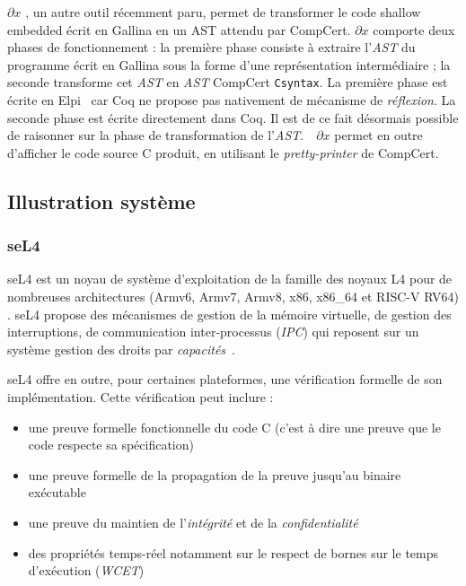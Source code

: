 $\partial x$ \cite{partialx, partialxrepo}, un autre outil récemment paru, permet de transformer le code shallow embedded écrit en Gallina en un AST attendu par CompCert. $\partial x$ comporte deux phases de fonctionnement : la première phase consiste à extraire l'\emph{AST} du programme écrit en Gallina sous la forme d'une représentation intermédiaire ; la seconde transforme cet \emph{AST} en \emph{AST} CompCert \texttt{Csyntax}. La première phase est écrite en Elpi~\cite{elpi} car Coq ne propose pas nativement de mécanisme de \emph{réflexion}. La seconde phase est écrite directement dans Coq. Il est de ce fait désormais possible de raisonner sur la phase de transformation de l'\emph{AST}.~~$\partial x$ permet en outre d'afficher le code source C produit, en utilisant le \emph{pretty-printer} de CompCert.

		\subsection{Illustration système}	

			\subsubsection{seL4}
	seL4 \cite{sel4website} est un noyau de système d'exploitation de la famille des noyaux L4 pour de nombreuses architectures (Armv6, Armv7, Armv8, x86, x86\_64 et RISC-V RV64) \cite{sel4hardware}. seL4 propose des mécanismes de gestion de la mémoire virtuelle, de gestion des interruptions, de communication inter-processus (\emph{IPC}) qui reposent sur un système gestion des droits par \emph{capacités}~\cite{capabilities}.

	seL4 offre en outre, pour certaines plateformes, une vérification formelle de son implémentation. Cette vérification peut inclure :
	\begin{itemize}
		\item{une preuve formelle fonctionnelle du code C (c'est à dire une preuve que le code respecte sa spécification) \cite{sel4}}
		\item{une preuve formelle de la propagation de la preuve jusqu'au binaire exécutable\cite{sel4binary}}
		\item{une preuve du maintien de l'\emph{intégrité} et de la \emph{confidentialité} \cite{sel4integrity}}
		\item{des propriétés temps-réel notamment sur le respect de bornes sur le temps d'exécution (\emph{WCET})\cite{sel4wcet}}
	\end{itemize}

